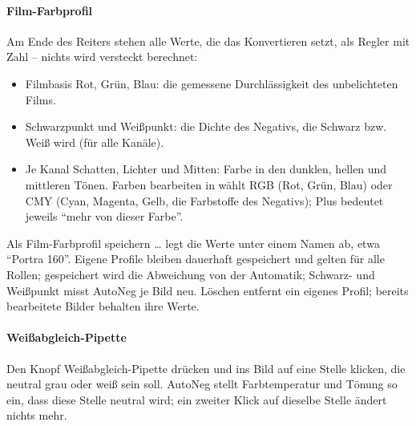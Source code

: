 \documentclass[a4paper,11pt,parskip=half,DIV=12]{scrartcl}
\newcommand{\menu}[1]{\textsf{#1}}                    %
\begin{document}
\paragraph{Film-Farbprofil} Am Ende des Reiters stehen alle Werte, die das Konvertieren
setzt, als Regler mit Zahl -- nichts wird versteckt berechnet:
\begin{itemize}
  \item \menu{Filmbasis} Rot, Grün, Blau: die gemessene Durchlässigkeit des unbelichteten Films.
  \item \menu{Schwarzpunkt} und \menu{Weißpunkt}: die Dichte des Negativs, die Schwarz bzw.
        Weiß wird (für alle Kanäle).
  \item Je Kanal \menu{Schatten}, \menu{Lichter} und \menu{Mitten}: Farbe in den dunklen,
        hellen und mittleren Tönen. \menu{Farben bearbeiten in} wählt \menu{RGB} (Rot, Grün,
        Blau) oder \menu{CMY} (Cyan, Magenta, Gelb, die Farbstoffe des Negativs); Plus
        bedeutet jeweils \enquote{mehr von dieser Farbe}.
\end{itemize}
\menu{Als Film-Farbprofil speichern …} legt die Werte unter einem Namen ab, etwa
\enquote{Portra 160}. Eigene Profile bleiben dauerhaft gespeichert und gelten für alle Rollen;
gespeichert wird die Abweichung von der Automatik; Schwarz- und Weißpunkt misst AutoNeg je
Bild neu. \menu{Löschen} entfernt ein eigenes Profil; bereits bearbeitete Bilder
behalten ihre Werte.

\paragraph{Weißabgleich-Pipette} Den Knopf \menu{Weißabgleich-Pipette} drücken und ins Bild auf
eine Stelle klicken, die neutral grau oder weiß sein soll. AutoNeg stellt \menu{Farbtemperatur}
und \menu{Tönung} so ein, dass diese Stelle neutral wird; ein zweiter Klick auf dieselbe Stelle
ändert nichts mehr.
\end{document}
